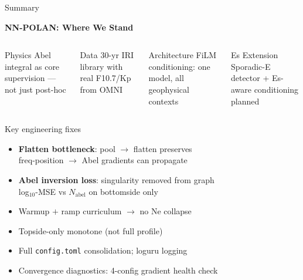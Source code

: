 \documentclass[aspectratio=169,10pt]{beamer}
\begin{document}
\begin{frame}{Summary}
\begin{center}
\large\textbf{NN-POLAN: Where We Stand}
\end{center}
\vspace{2pt}
\begin{columns}
\begin{block}{\centering\scriptsize Physics}
  \centering\scriptsize
  Abel integral as core supervision — not just post-hoc
\end{block}
\begin{block}{\centering\scriptsize Data}
  \centering\scriptsize
  30-yr IRI library with real F10.7/Kp from OMNI
\end{block}
\begin{block}{\centering\scriptsize Architecture}
  \centering\scriptsize
  FiLM conditioning: one model, all geophysical contexts
\end{block}
\begin{block}{\centering\scriptsize Es Extension}
  \centering\scriptsize
  Sporadic-E detector + Es-aware conditioning planned
\end{block}
\end{columns}
\vspace{5pt}
\begin{columns}
\begin{alertblock}{\centering\scriptsize Key engineering fixes}
  \scriptsize
  \begin{itemize}
    \item \textbf{Flatten bottleneck}: pool $\to$ flatten preserves\\
          freq-position $\to$ Abel gradients can propagate
    \item \textbf{Abel inversion loss}: singularity removed from graph\\
          log$_{10}$-MSE vs $N_\mathrm{abel}$ on bottomside only
    \item Warmup $+$ ramp curriculum $\to$ no Ne collapse
    \item Topside-only monotone (not full profile)
    \item Full \texttt{config.toml} consolidation; loguru logging
    \item Convergence diagnostics: 4-config gradient health check

\end{itemize}
\end{alertblock}
\end{columns}
\end{frame}
\end{document}
